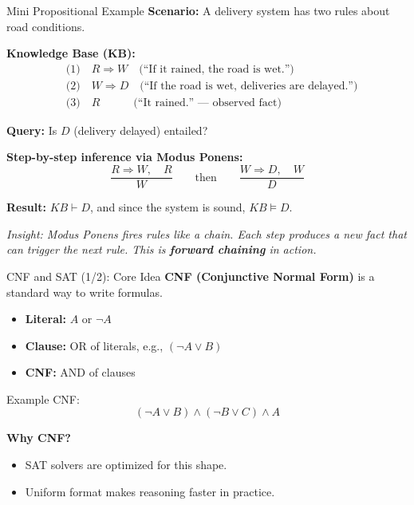 \documentclass[10pt]{beamer}
\begin{document}
\begin{frame}{Mini Propositional Example}
    \textbf{Scenario:} A delivery system has two rules about road conditions.

    \vspace{0.1cm}
    \textbf{Knowledge Base (KB):}
    \[
    \begin{aligned}
      &\text{(1)}\quad R \Rightarrow W \quad \text{(``If it rained, the road is wet.'')} \\
      &\text{(2)}\quad W \Rightarrow D \quad \text{(``If the road is wet, deliveries are delayed.'')} \\
      &\text{(3)}\quad R \quad\quad\quad \text{(``It rained.'' — observed fact)}
    \end{aligned}
    \]

    \vspace{0.1cm}
    \textbf{Query:} Is $D$ (delivery delayed) entailed?

    \vspace{0.1cm}
    \textbf{Step-by-step inference via Modus Ponens:}
    \[
      \frac{R \Rightarrow W,\quad R}{W} \qquad \text{then} \qquad \frac{W \Rightarrow D,\quad W}{D}
    \]

    \textbf{Result:} $KB \vdash D$, and since the system is sound, $KB \models D$.

    \vspace{0.1cm}
    \textit{Insight: Modus Ponens fires rules like a chain. Each step produces a new fact that can trigger the next rule. This is \textbf{forward chaining} in action.}
\end{frame}

\begin{frame}{CNF and SAT (1/2): Core Idea}
        \textbf{CNF (Conjunctive Normal Form)} is a standard way to write formulas.

        \vspace{0.1cm}
        \begin{itemize}
                \item \textbf{Literal:} $A$ or $\neg A$
                \item \textbf{Clause:} OR of literals, e.g., $(\neg A \lor B)$
                \item \textbf{CNF:} AND of clauses
        \end{itemize}

        \vspace{0.1cm}
        Example CNF:
        \[
            (\neg A \lor B) \land (\neg B \lor C) \land A
        \]

        \vspace{0.1cm}
        \textbf{Why CNF?}
        \begin{itemize}
                \item SAT solvers are optimized for this shape.
                \item Uniform format makes reasoning faster in practice.
        \end{itemize}
\end{frame}
\end{document}
